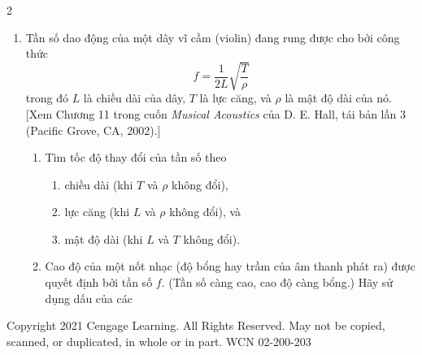 \begin{multicols}{2}
\begin{enumerate}[label=\textbf{\arabic*.}, leftmargin=*, itemsep=10pt, topsep=0pt]
  \item Tần số dao động của một dây vĩ cầm (violin) đang rung được cho bởi công thức
  \[
  f = \frac{1}{2L} \sqrt{\frac{T}{\rho}}
  \]
  trong đó $L$ là chiều dài của dây, $T$ là lực căng, và $\rho$ là mật độ dài của nó. [Xem Chương 11 trong cuốn \textit{Musical Acoustics} của D. E. Hall, tái bản lần 3 (Pacific Grove, CA, 2002).]
  \begin{enumerate}[label=(\alph*), itemsep=2pt, topsep=2pt, leftmargin=*]
    \item Tìm tốc độ thay đổi của tần số theo
    \begin{enumerate}[label=(\roman*), itemsep=1pt, topsep=1pt, leftmargin=*]
      \item chiều dài (khi $T$ và $\rho$ không đổi),
      \item lực căng (khi $L$ và $\rho$ không đổi), và
      \item mật độ dài (khi $L$ và $T$ không đổi).
    \end{enumerate}
    \item Cao độ của một nốt nhạc (độ bổng hay trầm của âm thanh phát ra) được quyết định bởi tần số $f$. (Tần số càng cao, cao độ càng bổng.) Hãy sử dụng dấu của các
  \end{enumerate}

\end{enumerate}

\end{multicols}

\vfill
\begin{center}
\scriptsize\color{black!70}
Copyright 2021 Cengage Learning. All Rights Reserved. May not be copied, scanned, or duplicated, in whole or in part. WCN 02-200-203
\end{center}
